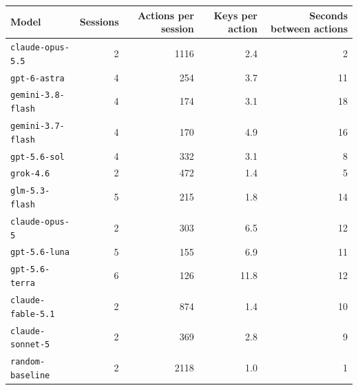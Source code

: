 \begin{tabular}{@{}lrrrr@{}}
\toprule
Model & Sessions & Actions per session & Keys per action & Seconds between actions \\
\midrule
\texttt{claude-opus-5.5} & 2 & 1116 & 2.4 & 2 \\
\texttt{gpt-6-astra} & 4 & 254 & 3.7 & 11 \\
\texttt{gemini-3.8-flash} & 4 & 174 & 3.1 & 18 \\
\texttt{gemini-3.7-flash} & 4 & 170 & 4.9 & 16 \\
\texttt{gpt-5.6-sol} & 4 & 332 & 3.1 & 8 \\
\texttt{grok-4.6} & 2 & 472 & 1.4 & 5 \\
\texttt{glm-5.3-flash} & 5 & 215 & 1.8 & 14 \\
\texttt{claude-opus-5} & 2 & 303 & 6.5 & 12 \\
\texttt{gpt-5.6-luna} & 5 & 155 & 6.9 & 11 \\
\texttt{gpt-5.6-terra} & 6 & 126 & 11.8 & 12 \\
\texttt{claude-fable-5.1} & 2 & 874 & 1.4 & 10 \\
\texttt{claude-sonnet-5} & 2 & 369 & 2.8 & 9 \\
\midrule
\texttt{random-baseline} & 2 & 2118 & 1.0 & 1 \\
\bottomrule
\end{tabular}
